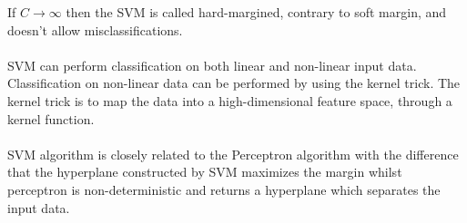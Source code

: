 If $C \rightarrow \infty$ then the SVM is called hard-margined, contrary to soft margin, and doesn't allow misclassifications. 
\\\\
SVM can perform classification on both linear and non-linear input data. Classification on non-linear data can be performed by using the kernel trick. The kernel trick is to map the data into a high-dimensional feature space, through a kernel function. \citep{svm_ai}
\\\\
SVM algorithm is closely related to the Perceptron algorithm with the difference that the hyperplane constructed by SVM maximizes the margin whilst perceptron is non-deterministic and returns a hyperplane which separates the input data. 
